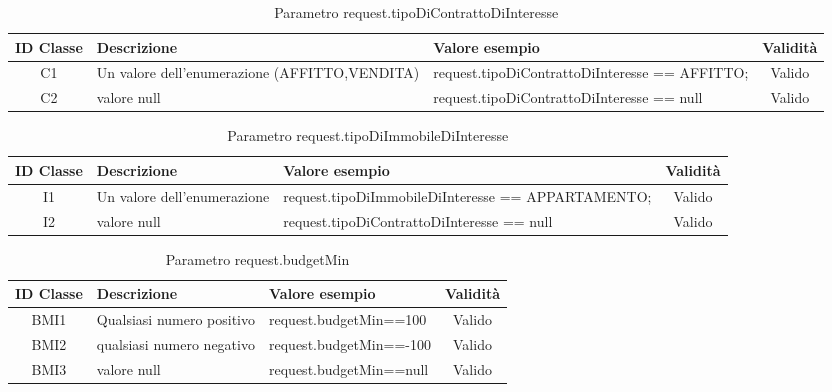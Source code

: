 \begin{table}[H]
	\centering
	\begin{tabular}{|c|p{6cm}|p{6.2cm}|c|} 
		\hline
		\textbf{ID Classe} & \textbf{Descrizione} & \textbf{Valore esempio} & \textbf{Validità} \\
		\hline
		C1 & Un valore dell'enumerazione (AFFITTO,VENDITA)
		& request.tipoDiContrattoDiInteresse == AFFITTO; & Valido \\
		\hline
		C2 & valore null
		& request.tipoDiContrattoDiInteresse == null & Valido \\
		\hline
	\end{tabular}
	\caption{Parametro request.tipoDiContrattoDiInteresse}
	\label{tab:parametriRequestTipoDiContrattoDiInteresse}
\end{table}

\begin{table}[H]
	\centering
	\begin{tabular}{|c|p{6cm}|p{6.2cm}|c|} 
		\hline
		\textbf{ID Classe} & \textbf{Descrizione} & \textbf{Valore esempio} & \textbf{Validità} \\
		\hline
		I1 & Un valore dell'enumerazione
		& request.tipoDiImmobileDiInteresse == APPARTAMENTO; & Valido \\
		\hline
		I2 & valore null
		& request.tipoDiContrattoDiInteresse == null & Valido \\
		\hline
	\end{tabular}
	\caption{Parametro request.tipoDiImmobileDiInteresse}
	\label{tab:parametriRequestTipoDiImmobileDiInteresse}
\end{table}

\begin{table}[H]
	\centering
	\begin{tabular}{|c|p{4cm}|p{5.5cm}|c|} 
		\hline
		\textbf{ID Classe} & \textbf{Descrizione} & \textbf{Valore esempio} & \textbf{Validità} \\
		\hline
		BMI1 & Qualsiasi numero positivo
		& request.budgetMin==100 & Valido \\
		\hline
		BMI2 & qualsiasi numero negativo
		& request.budgetMin==-100 & Valido \\
		\hline
		BMI3 & valore null
		& request.budgetMin==null & Valido \\
		\hline
	\end{tabular}
	\caption{Parametro request.budgetMin}
	\label{tab:parametriRequestBudgetMin}
\end{table}

